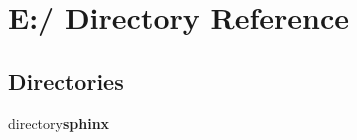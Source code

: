 \section{E:/ Directory Reference}
\label{dir_000000}
\subsection*{Directories}
\begin{CompactItemize}
\item 
directory{\bf sphinx}
\end{CompactItemize}
